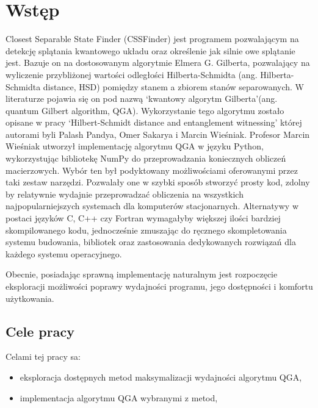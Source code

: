 \documentclass[11pt, a4paper]{article}
\begin{document}
  \begin{sloppypar}
    \section{Wstęp}


    Closest Separable State Finder (CSSFinder) jest programem pozwalającym na detekcję splątania
    kwantowego układu oraz określenie jak silnie owe splątanie jest. Bazuje on na
    dostosowanym algorytmie Elmera G. Gilberta, pozwalający na wyliczenie przybliżonej
    wartości odległości Hilberta-Schmidta (ang. Hilberta-Schmidta distance, HSD)
    pomiędzy stanem a zbiorem stanów separowanych. W literaturze pojawia się on pod nazwą
    `kwantowy algorytm Gilberta'(ang. quantum Gilbert algorithm, QGA)\cite{MW_Variational_approach}.
    Wykorzystanie tego algorytmu zostało opisane w pracy `Hilbert-Schmidt distance and entanglement
    witnessing' której autorami byli Palash Pandya, Omer Sakarya i Marcin Wieśniak\cite{MW_Hilbert_Schmidt_distance}.
    Profesor Marcin Wieśniak utworzył implementację algorytmu QGA w języku Python,
    wykorzystując bibliotekę NumPy do przeprowadzania koniecznych obliczeń macierzowych.
    Wybór ten był podyktowany możliwościami oferowanymi przez taki zestaw narzędzi.
    Pozwalały one w szybki sposób stworzyć prosty kod, zdolny by relatywnie wydajnie przeprowadzać
    obliczenia na wszystkich najpopularniejszych systemach dla komputerów stacjonarnych.
    Alternatywy w postaci języków C, C++ czy Fortran wymagałyby większej ilości bardziej
    skompilowanego kodu, jednocześnie zmuszając do ręcznego skompletowania systemu
    budowania, bibliotek oraz zastosowania dedykowanych rozwiązań dla każdego systemu operacyjnego.

    Obecnie, posiadając sprawną implementację naturalnym jest rozpoczęcie eksploracji
    możliwości poprawy wydajności programu, jego dostępności i komfortu użytkowania.

    \subsection{Cele pracy}


    Celami tej pracy sa:

    \begin{itemize}
      \item eksploracja dostępnych metod maksymalizacji wydajności algorytmu
        QGA,

      \item implementacja algorytmu QGA wybranymi z metod,


\end{itemize}
\end{sloppypar}
\end{document}
